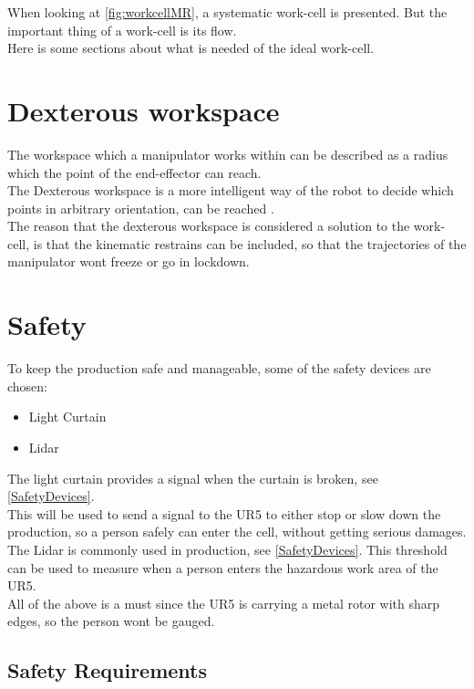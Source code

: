 When looking at \ref{fig:workcellMR}, a systematic work-cell is presented. But the important thing of a work-cell is its flow.\\
Here is some sections about what is needed of the ideal work-cell.

\section{Dexterous workspace}

The workspace which a manipulator works within can be described as a radius which the point of the end-effector can reach.\\
The Dexterous workspace is a more intelligent way of the robot to decide which points in arbitrary orientation, can be reached \cite{Dexterous}.\\
The reason that the dexterous workspace is considered a solution to the work-cell, is that the kinematic restrains can be included, so that the trajectories of the manipulator wont freeze or go in lockdown.\\


\section{Safety}

To keep the production safe and manageable, some of the safety devices are chosen:

\begin{itemize}
    \item Light Curtain
    \item Lidar
\end{itemize}

The light curtain provides a signal when the curtain is broken, see \ref{SafetyDevices}.\\
This will be used to send a signal to the UR5 to either stop or slow down the production, so a person safely can enter the cell, without getting serious damages.\\

The Lidar is commonly used in production, see \ref{SafetyDevices}.
This threshold can be used to measure when a person enters the hazardous work area of the UR5.\\
All of the above is a must since the UR5 is carrying a metal rotor with sharp edges, so the person wont be gauged.\\

\subsection{Safety Requirements}

